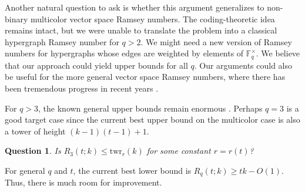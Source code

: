 \documentclass[a4paper,11pt]{amsproc}
\theoremstyle{plain}
\newtheorem{Question} [Theorem] {Question}
\theoremstyle{definition}
\begin{document}
Another natural question to ask is whether this argument generalizes to non-binary multicolor vector space Ramsey numbers. 
The coding-theoretic idea remains intact, but we were unable to translate the problem into a classical hypergraph Ramsey number for $q > 2$. 
We might need a new version of Ramsey numbers for hypergraphs whose edges are weighted by elements of $\mathbb{F}_q^\times$. 
We believe that our approach could yield upper bounds for all $q$.
Our arguments could also be useful for the more general vector space Ramsey numbers, where there has been tremendous progress in recent years \cite{FredericksonYepremyan, HunterPohoata}.

For $q>3$, the known general upper bounds remain enormous \cite{Shelah, Spencer}.
Perhaps $q = 3$ is a good target case since the current best upper bound on the multicolor case \cite[Theorem 1.3]{FredericksonYepremyan} is also a tower of height $(k - 1)(t - 1) + 1$. 
\begin{Question}
    Is $R_3(t; k) \leq \mathrm{twr}_r(k)$ for some constant $r = r(t)$?
\end{Question}


For general $q$ and $t$, the current best lower bound \cite{BishnoiCamesVanBatenburgRavi} is $R_q(t; k) \geq tk - O(1)$. 
Thus, there is much room for improvement. 
\end{document}
